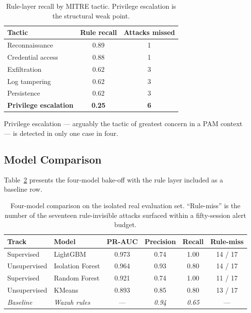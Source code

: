 \documentclass{classeENS}
\begin{document}
\begin{table}[H]
\centering
\begin{tabular}{|l|c|c|}
\hline
\textbf{Tactic} & \textbf{Rule recall} & \textbf{Attacks missed} \\
\hline
Reconnaissance & 0.89 & 1 \\
Credential access & 0.88 & 1 \\
Exfiltration & 0.62 & 3 \\
Log tampering & 0.62 & 3 \\
Persistence & 0.62 & 3 \\
\textbf{Privilege escalation} & \textbf{0.25} & \textbf{6} \\
\hline
\end{tabular}
\caption{Rule-layer recall by MITRE tactic. Privilege escalation is the structural weak point.}
\label{tab:tactic}
\end{table}

Privilege escalation --- arguably the tactic of greatest concern in a PAM context --- is detected in only one case in four.

\subsection{Model Comparison}
Table~\ref{tab:results} presents the four-model bake-off with the rule layer included as a baseline row.

\begin{table}[H]
\centering
\begin{tabular}{|l|l|c|c|c|c|}
\hline
\textbf{Track} & \textbf{Model} & \textbf{PR-AUC} & \textbf{Precision} & \textbf{Recall} & \textbf{Rule-miss} \\
\hline
Supervised & LightGBM & 0.973 & 0.74 & 1.00 & 14 / 17 \\
Unsupervised & Isolation Forest & 0.964 & 0.93 & 0.80 & 14 / 17 \\
Supervised & Random Forest & 0.921 & 0.74 & 1.00 & 11 / 17 \\
Unsupervised & KMeans & 0.893 & 0.85 & 0.80 & 13 / 17 \\
\hline
\textit{Baseline} & \textit{Wazuh rules} & --- & \textit{0.94} & \textit{0.65} & --- \\
\hline
\end{tabular}
\caption{Four-model comparison on the isolated real evaluation set. ``Rule-miss'' is the number of the seventeen rule-invisible attacks surfaced within a fifty-session alert budget.}
\label{tab:results}
\end{table}
\end{document}
